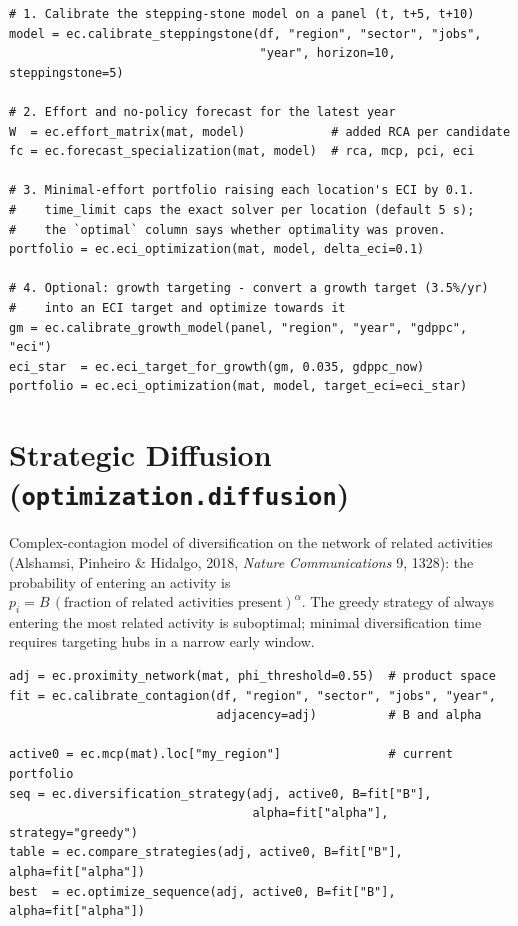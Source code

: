 \documentclass[12pt, a4paper]{article}
\begin{document}
\begin{lstlisting}[caption={ECI Optimization workflow}]
# 1. Calibrate the stepping-stone model on a panel (t, t+5, t+10)
model = ec.calibrate_steppingstone(df, "region", "sector", "jobs",
                                   "year", horizon=10, steppingstone=5)

# 2. Effort and no-policy forecast for the latest year
W  = ec.effort_matrix(mat, model)            # added RCA per candidate
fc = ec.forecast_specialization(mat, model)  # rca, mcp, pci, eci

# 3. Minimal-effort portfolio raising each location's ECI by 0.1.
#    time_limit caps the exact solver per location (default 5 s);
#    the `optimal` column says whether optimality was proven.
portfolio = ec.eci_optimization(mat, model, delta_eci=0.1)

# 4. Optional: growth targeting - convert a growth target (3.5%/yr)
#    into an ECI target and optimize towards it
gm = ec.calibrate_growth_model(panel, "region", "year", "gdppc", "eci")
eci_star  = ec.eci_target_for_growth(gm, 0.035, gdppc_now)
portfolio = ec.eci_optimization(mat, model, target_eci=eci_star)
\end{lstlisting}

\section{Strategic Diffusion (\texttt{optimization.diffusion})}

Complex-contagion model of diversification on the network of related
activities (Alshamsi, Pinheiro \& Hidalgo, 2018, \emph{Nature
Communications} 9, 1328): the probability of entering an activity is
$p_i = B\,(\text{fraction of related activities present})^{\alpha}$.
The greedy strategy of always entering the most related activity is
suboptimal; minimal diversification time requires targeting hubs in a
narrow early window.

\begin{lstlisting}[caption={Strategic diffusion workflow}]
adj = ec.proximity_network(mat, phi_threshold=0.55)  # product space
fit = ec.calibrate_contagion(df, "region", "sector", "jobs", "year",
                             adjacency=adj)          # B and alpha

active0 = ec.mcp(mat).loc["my_region"]               # current portfolio
seq = ec.diversification_strategy(adj, active0, B=fit["B"],
                                  alpha=fit["alpha"], strategy="greedy")
table = ec.compare_strategies(adj, active0, B=fit["B"], alpha=fit["alpha"])
best  = ec.optimize_sequence(adj, active0, B=fit["B"], alpha=fit["alpha"])
\end{lstlisting}
\end{document}
